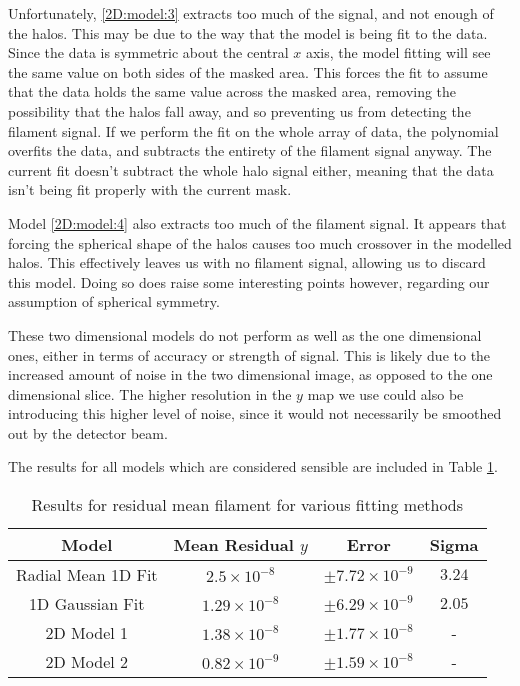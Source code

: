 \par Unfortunately, \ref{2D:model:3} extracts too much of the signal, and not enough of the halos. This may be due to the way that the model is being fit to the data. Since the data is symmetric about the central $x$ axis, the model fitting will see the same value on both sides of the masked area. This forces the fit to assume that the data holds the same value across the masked area, removing the possibility that the halos fall away, and so preventing us from detecting the filament signal. If we perform the fit on the whole array of data, the polynomial overfits the data, and subtracts the entirety of the filament signal anyway. The current fit doesn't subtract the whole halo signal either, meaning that the data isn't being fit properly with the current mask. 
\par Model \ref{2D:model:4} also extracts too much of the filament signal. It appears that forcing the spherical shape of the halos causes too much crossover in the modelled halos. This effectively leaves us with no filament signal, allowing us to discard this model. Doing so does raise some interesting points however, regarding our assumption of spherical symmetry. 


\par These two dimensional models do not perform as well as the one dimensional ones, either in terms of accuracy or strength of signal. This is likely due to the increased amount of noise in the two dimensional image, as opposed to the one dimensional slice. The higher resolution in the $y$ map we use could also be introducing this higher level of noise, since it would not necessarily be smoothed out by the detector beam. 

\par The results for all models which are considered sensible are included in Table \ref{table:results}. 

\begin{table}[h!]
\centering
\begin{tabular}{||c c c c||} 
 \hline
 Model & Mean Residual $y$  & Error & Sigma\\
 \hline\hline
 Radial Mean 1D Fit & $2.5\times 10^{-8} $ & $\pm 7.72 \times 10^{-9}$ & $3.24$\\
 \hline
 1D Gaussian Fit & $1.29\times 10^{-8} $ &  $\pm 6.29 \times 10^{-9}$ & $2.05$\\
 \hline
 2D Model 1 & $1.38\times 10^{-8}$ & $\pm 1.77 \times 10^{-8}$ &  - \\
 \hline 
 2D Model 2 & $0.82 \times 10^{-9} $ &  $\pm 1.59 \times 10^{-8}$ & - \\
 \hline \hline 
\end{tabular}
\caption{Results for residual mean filament for various fitting methods }
\label{table:results}
\end{table}

